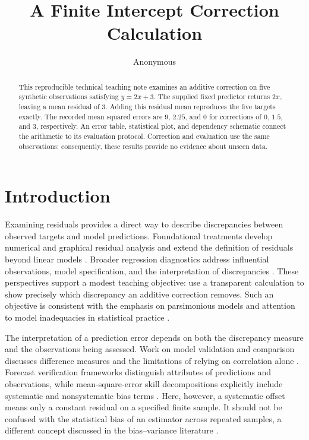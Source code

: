 \documentclass[11pt]{article}
\title{A Finite Intercept Correction Calculation}
\author{Anonymous}
\date{}
\begin{document}
\maketitle
\begin{abstract}
This reproducible technical teaching note examines an additive correction on five synthetic observations satisfying $y=2x+3$. The supplied fixed predictor returns $2x$, leaving a mean residual of $3$. Adding this residual mean reproduces the five targets exactly. The recorded mean squared errors are $9$, $2.25$, and $0$ for corrections of $0$, $1.5$, and $3$, respectively. An error table, statistical plot, and dependency schematic connect the arithmetic to its evaluation protocol. Correction and evaluation use the same observations; consequently, these results provide no evidence about unseen data.
\end{abstract}
\section{Introduction}

Examining residuals provides a direct way to describe discrepancies between observed targets and model predictions. Foundational treatments develop numerical and graphical residual analysis and extend the definition of residuals beyond linear models \cite{Anscombe1963ExaminationAnalysis,Cox1968GeneralDefinition}. Broader regression diagnostics address influential observations, model specification, and the interpretation of discrepancies \cite{Belsley1980RegressionDiagnostics,Bollen1985RegressionDiagnostics,Davison1992RegressionModel}. These perspectives support a modest teaching objective: use a transparent calculation to show precisely which discrepancy an additive correction removes. Such an objective is consistent with the emphasis on parsimonious models and attention to model inadequacies in statistical practice \cite{Box1976ScienceStatistics}.

The interpretation of a prediction error depends on both the discrepancy measure and the observations being assessed. Work on model validation and comparison discusses difference measures and the limitations of relying on correlation alone \cite{Willmott1981ValidationModels,Willmott1985StatisticsEvaluation}. Forecast verification frameworks distinguish attributes of predictions and observations, while mean-square-error skill decompositions explicitly include systematic and nonsystematic bias terms \cite{Murphy1987GeneralFramework,Murphy1988SkillScores}. Here, however, a systematic offset means only a constant residual on a specified finite sample. It should not be confused with the statistical bias of an estimator across repeated samples, a different concept discussed in the bias--variance literature \cite{Geman1992NeuralNetworks}.
\end{document}
